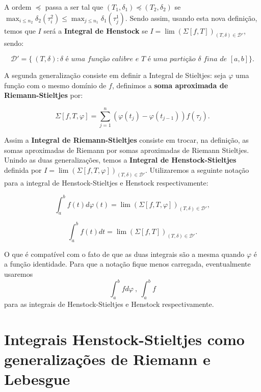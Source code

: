 \documentclass[12pt, a4paper]{article}
\theoremstyle{definition}
\begin{document}
A ordem $\preccurlyeq$ passa a ser tal que $(T_1,\delta_1)\preccurlyeq (T_2,\delta_2)$ se $\max_{i\leq n_2} \delta_2(\tau^2_i)\leq \max_{j\leq n_1} \delta_1(\tau^1_j)$. Sendo assim, usando esta nova definição, temos que $I$ será a \textbf{Integral de Henstock} se $I=\lim ( \Sigma [f,T])_{(T,\delta)\in \mathcal{D}'}$, sendo:

$$\mathcal{D'}=\{\ (T,\delta): \delta \textit{ é uma função calibre e } T  \textit{ é uma partição } \delta \textit{ fina de } [a,b] \}.$$

A segunda generalização consiste em definir a Integral de Stieltjes: seja $\varphi$ uma função com o mesmo domínio de $f$, definimos a \textbf{soma aproximada de Riemann-Stieltjes} por:

$$\Sigma [f,T,\varphi]=\sum_{j=1}^n (\varphi(t_j)-\varphi(t_{j-1}))f(\tau_j).$$

Assim a \textbf{Integral de Riemann-Stieltjes} consiste em trocar, na definição, as somas aproximadas de Riemann por somas aproximadas de Riemann Stieltjes. Unindo as duas generalizações, temos a \textbf{Integral de Henstock-Stieltjes} definida por $I=\lim ( \Sigma [f,T,\varphi])_{(T,\delta)\in \mathcal{D}'}$. Utilizaremos a seguinte notação para a integral de Henstock-Stieltjes e Henstock respectivamente: 

$$\int_a^b f(t) \textit{d}\varphi(t) =\lim ( \Sigma [f,T,\varphi])_{(T,\delta)\in \mathcal{D}'}, $$

$$\int_a^b f(t) \textit{d}t =\lim ( \Sigma [f,T])_{(T,\delta)\in \mathcal{D'}}. $$

O que é compatível com o fato de que as duas integrais são a mesma quando $\varphi$ é a função identidade. Para que a notação fique menos carregada, eventualmente usaremos $$\int_a^b f \textit{d}\varphi \ , \ \int_a^b f $$ para as integrais de Henstock-Stieltjes e Henstock respectivamente.  

\section{Integrais Henstock-Stieltjes como generalizações de Riemann e Lebesgue}
\end{document}
